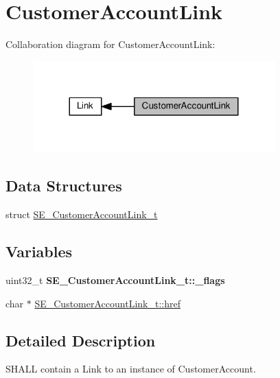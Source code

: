 \hypertarget{group__CustomerAccountLink}{}\section{Customer\+Account\+Link}
\label{group__CustomerAccountLink}
Collaboration diagram for Customer\+Account\+Link\+:\nopagebreak
\begin{figure}[H]
\begin{center}
\leavevmode
\includegraphics[width=264pt]{group__CustomerAccountLink}
\end{center}
\end{figure}
\subsection*{Data Structures}
\begin{DoxyCompactItemize}
\item 
struct \hyperlink{structSE__CustomerAccountLink__t}{S\+E\+\_\+\+Customer\+Account\+Link\+\_\+t}
\end{DoxyCompactItemize}
\subsection*{Variables}
\begin{DoxyCompactItemize}
\item 
\mbox{\label{group__CustomerAccountLink_gaeab9c49425b287b5e4c4e4ce0fdba6c3}} 
uint32\+\_\+t {\bfseries S\+E\+\_\+\+Customer\+Account\+Link\+\_\+t\+::\+\_\+flags}
\item 
char $\ast$ \hyperlink{group__CustomerAccountLink_gade16911557e0fd6f102bbcf2573aa757}{S\+E\+\_\+\+Customer\+Account\+Link\+\_\+t\+::href}
\end{DoxyCompactItemize}


\subsection{Detailed Description}
S\+H\+A\+LL contain a Link to an instance of Customer\+Account. 

